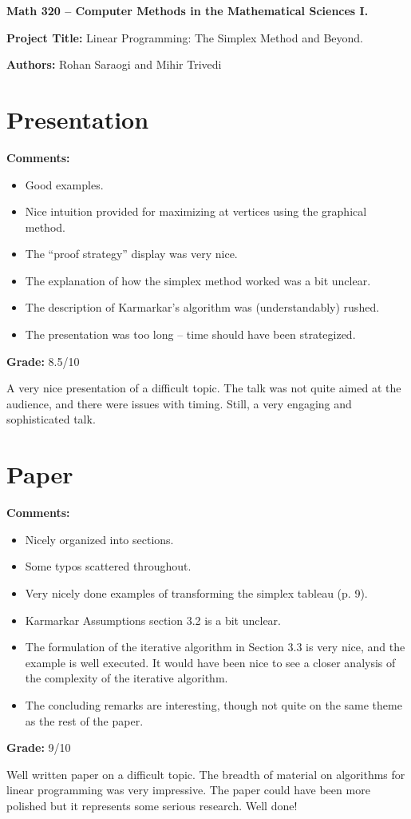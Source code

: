 \documentclass[12pt]{article}
\begin{document}
{\bf \large Math 320 -- Computer Methods in the Mathematical Sciences I.}\\

\vspace{3mm}

{\bf \large Project Title:} Linear Programming: The Simplex Method and Beyond.\\
\vspace{2mm}

{\bf \large Authors:} Rohan Saraogi and Mihir Trivedi\\

\vspace{3mm}

\section{Presentation}
{\bf \large Comments:}
\begin{itemize}
\item Good examples.
\item Nice intuition provided for maximizing at vertices using
the graphical method.
\item The ``proof strategy'' display was very nice.
\item The explanation of how the simplex method worked was a bit unclear.
\item The description of Karmarkar's algorithm was (understandably) rushed.
\item The presentation was too long -- time should have been strategized.
\end{itemize}

{\bf \large Grade:} 8.5/10

A very nice presentation of a difficult topic. The talk was not
quite aimed at the audience, and there were issues with timing.
Still, a very engaging and sophisticated talk.

\section{Paper}

{\bf \large Comments:}
\begin{itemize}
\item Nicely organized into sections.
\item Some typos scattered throughout.
\item Very nicely done examples of transforming the simplex tableau (p. 9).
\item Karmarkar Assumptions section 3.2 is a bit unclear.
\item The formulation of the iterative algorithm in Section 3.3 is very nice,
and the example is well executed. It would have been nice to see a closer
analysis of the complexity of the iterative algorithm.
\item The concluding remarks are interesting, though not quite on the same theme as the rest of the paper.
\end{itemize}

{\bf \large Grade:} 9/10

Well written paper on a difficult topic. The breadth of 
material on algorithms for linear programming was very 
impressive. The paper could have been more polished but it
represents some serious research. Well done!
\end{document}

